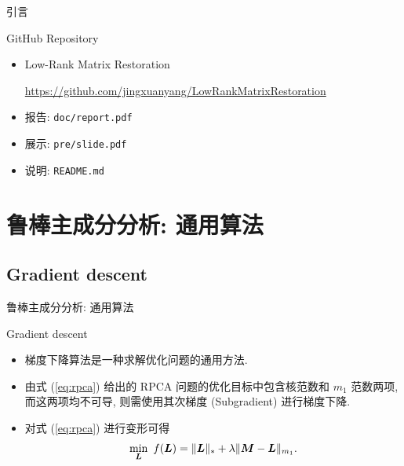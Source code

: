 \documentclass{beamer}
\begin{document}
\begin{frame}{引言}
  \begin{block}{GitHub Repository}
    \begin{itemize}
      \item Low-Rank Matrix Restoration
      
      {\color{purple}\footnotesize\url{https://github.com/jingxuanyang/LowRankMatrixRestoration}}

      \item 报告: \texttt{doc/report.pdf}
      \item 展示: \texttt{pre/slide.pdf}
      \item 说明: \texttt{README.md}
    \end{itemize}
  \end{block}
\end{frame}

\section[RPCA: 通用算法]{鲁棒主成分分析: 通用算法}

\subsection{Gradient descent}

\begin{frame}{鲁棒主成分分析: 通用算法}
  \begin{block}{Gradient descent}
    \begin{itemize}
      \item 梯度下降算法是一种求解优化问题的通用方法.
      \item 由式 (\ref{eq:rpca}) 给出的 RPCA 问题的优化目标中包含核范数和 $m_1$ 范数两项, 而这两项均不可导, 则需使用其次梯度 (Subgradient) \cite{boyd2003subgradient} 进行梯度下降.
      \item 对式 (\ref{eq:rpca}) 进行变形可得
      \begin{equation}
        \min_{\bm{L}}~f(\bm{L})=\|\bm{L}\|_{*}+\lambda\|\bm{M}-\bm{L}\|_{m_1}.
      \end{equation}
    \end{itemize}
  \end{block}
\end{frame}
\end{document}
